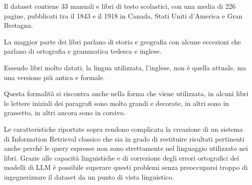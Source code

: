 Il dataset contiene 33 manuali e libri di testo scolastici, con una media di 226 pagine, pubblicati tra il 1843 e il 1918 in Canada, Stati Uniti d'America e Gran Bretagna.

La maggior parte dei libri parlano di storia e geografia con alcune eccezioni che parlano di ortografia e grammatica tedesca e inglese.

Essendo libri molto datati, la lingua utilizzata, l'inglese, non è quella attuale, ma una versione più antica e formale.

Questa formalità si riscontra anche nella forma che viene utilizzata, in alcuni libri le lettere iniziali dei paragrafi sono molto grandi e decorate, in altri sono in grassetto, in altri ancora sono in corsivo.

Le caratteristiche riportate sopra rendono complicata la creazione di un sistema di Information Retrieval classico che 
sia in grado di restituire risultati pertinenti anche perché le query espresse non sono strettamente nel linguaggio utilizzato nei libri.
Grazie alle capacità linguistiche e di correzione degli errori ortografici dei modelli di LLM è possibile superare questi problemi senza preoccuparsi troppo di ingegnerizzare il dataset da un punto di vista linguistico.
